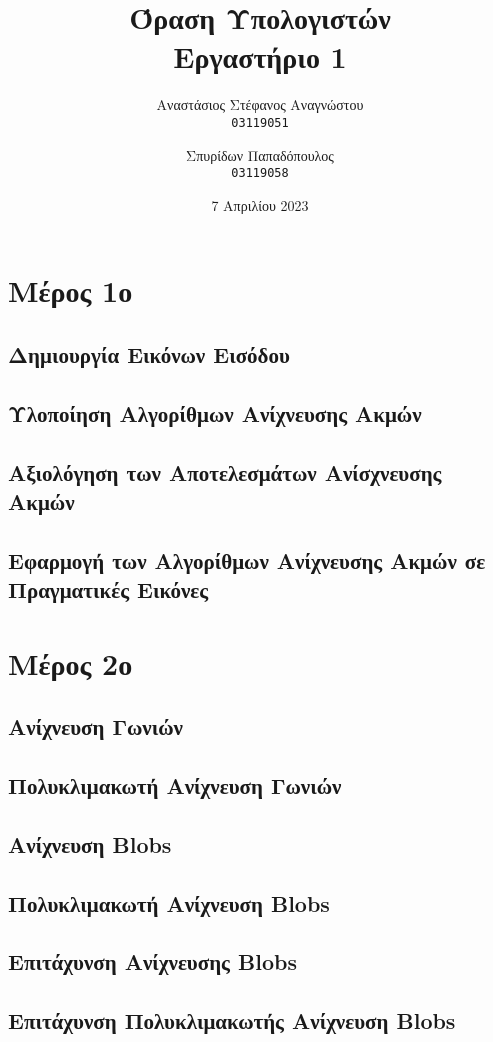 \documentclass{article}
\title{Όραση Υπολογιστών\\
        \large Εργαστήριο 1}
\author{Αναστάσιος Στέφανος Αναγνώστου\\
    \texttt{03119051}
        \and
        Σπυρίδων Παπαδόπουλος\\
    \texttt{03119058}}
\date{7 Απριλίου 2023}
\newcommand{\eng}[1]{\foreignlanguage{english}{#1}}
\begin{document}
\maketitle

\section{Μέρος 1ο}

\subsection{Δημιουργία Εικόνων Εισόδου}

\subsection{Υλοποίηση Αλγορίθμων Ανίχνευσης Ακμών}

\subsection{Αξιολόγηση των Αποτελεσμάτων Ανίσχνευσης Ακμών}

\subsection{Εφαρμογή των Αλγορίθμων Ανίχνευσης Ακμών σε Πραγματικές Εικόνες}

\section{Μέρος 2ο}

\subsection{Ανίχνευση Γωνιών}

\subsection{Πολυκλιμακωτή Ανίχνευση Γωνιών}

\subsection{Ανίχνευση \eng{Blobs}}

\subsection{Πολυκλιμακωτή Ανίχνευση \eng{Blobs}}

\subsection{Επιτάχυνση Ανίχνευσης \eng{Blobs}}

\subsection{Επιτάχυνση Πολυκλιμακωτής Ανίχνευση \eng{Blobs}}
\end{document}
